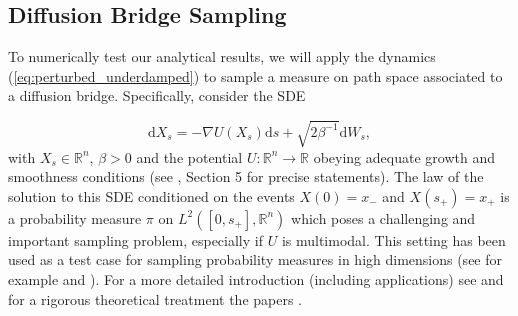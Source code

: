 \subsection{Diffusion Bridge Sampling}


To numerically test our analytical results, we will apply the dynamics
(\ref{eq:perturbed_underdamped}) to sample a measure on
path space associated to a diffusion bridge. Specifically, consider
the SDE 

\[
\mathrm{d}X_{s}=-\nabla U(X_{s})\mathrm{d}s+\sqrt{2\beta^{-1}}\mathrm{d}W_{s},
\]
with $X_{s}\in\mathbb{R}^{n}$, $\beta>0$ and the potential $U:\mathbb{R}^{n}\rightarrow\mathbb{R}$ obeying adequate growth and smoothness conditions (see \cite{HairerStuartVoss2007}, Section 5 for precise statements). The law of the solution to this SDE conditioned on the events $X(0)=x_{-}$ and $X(s_{+})=x_{+}$ is a probability measure $\pi$ on $L^{2}([0,s_{+}],\mathbb{R}^{n})$
which poses a challenging and important sampling problem, especially if $U$ is multimodal. This
setting has been used as a test case for sampling probability measures
in high dimensions (see for example \cite{BeskosPinskiSanz-SernaEtAl2011} and
\cite{OttobrePillaiPinskiEtAl2016}). For a more detailed introduction (including applications)
see \cite{BeskosStuart2009} and for a rigorous theoretical treatment
the papers \cite{HairerStuartVossEtAl2005,HairerStuartVoss2007,HairerStuartVos2009,BeskosStuart2009} .

